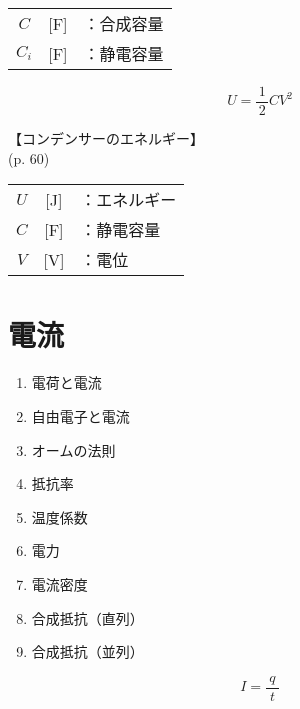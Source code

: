 \documentclass[10pt]{jarticle}
\begin{document}
\begin{tabular}{ccl}
$C$	&[F]	&：合成容量 \\
$C_i$	&[F]	&：静電容量 \\
\end{tabular}



\newpage
\[
U = \frac{1}{\, 2 \,} C V^2
\]


\vskip3mm
【コンデンサーのエネルギー】\\
\hfill {\footnotesize (p. 60)}

\begin{tabular}{ccl}
$U$	&[J]	&：エネルギー \\
$C$	&[F]	&：静電容量 \\
$V$	&[V]	&：電位
\end{tabular}






\newpage
\addtocounter{page}{-1}
\thispagestyle{empty}
\section{電流}

\begin{enumerate}
\setcounter{enumi}{\thepage}
\small
\itemsep-4mm
\item 電荷と電流 \\
\item 自由電子と電流 \\
\item オームの法則 \\
\item 抵抗率 \\
\item 温度係数 \\
\item 電力 \\
\item 電流密度 \\
\item 合成抵抗（直列） \\
\item 合成抵抗（並列） \\
\end{enumerate}





\newpage
\[
I = \frac{q}{\; t \;}
\]
\end{document}
